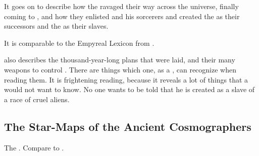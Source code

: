 It goes on to describe how the \banes{} ravaged their way across the universe, finally coming to \Miith{}, and how they enlisted \Semiza{} and his sorcerers and created the \resphain{} as their successors and the \humans{} as their slaves. 

It is comparable to the Empyreal Lexicon from .


\Semiza{} also describes the \psp{\banelords}{} thousand-year-long plans that were laid, and their many weapons to control \humanity.
There are things which one, as a \human, can recognize when reading them. It is frightening reading, because it reveals a lot of things that a \human{} would not want to know. No one wants to be told that he is created as a slave of a race of cruel aliens. 









\subsection{The Star-Maps of the Ancient Cosmographers}
The . Compare to . 

